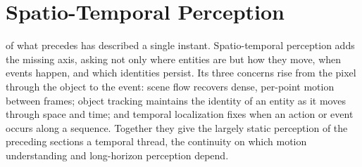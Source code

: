 


\section{Spatio-Temporal Perception}
\label{sec:p3-sec6-4-spatio-temporal-perception}

 of what precedes has described a single instant. Spatio-temporal perception adds the missing axis, asking not only where entities are but how they move, when events happen, and which identities persist. 
Its three concerns rise from the pixel through the object to the event: scene flow recovers dense, per-point motion between frames; object tracking maintains the identity of an entity as it moves through space and time; and temporal localization fixes when an action or event occurs along a sequence.
Together they give the largely static perception of the preceding sections a temporal thread, the continuity on which motion understanding and long-horizon perception depend.















